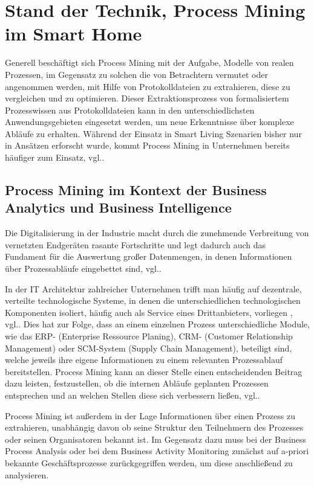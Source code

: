 \chapter{Stand der Technik, Process Mining im Smart Home}\label{chap:stateoftheart}
Generell beschäftigt sich Process Mining mit der Aufgabe, Modelle von realen Prozessen, im Gegensatz zu solchen die von Betrachtern vermutet oder angenommen werden, mit Hilfe von Protokolldateien zu extrahieren, diese zu vergleichen und zu optimieren.\cite{PMinAction}
Dieser Extraktionsprozess von formalisiertem Prozesswissen aus Protokolldateien kann in den  unterschiedlichsten Anwendungsgebieten eingesetzt werden, um neue Erkenntnisse über komplexe Abläufe zu erhalten. Während der Einsatz in Smart Living Szenarien bisher nur in Ansätzen erforscht wurde, kommt Process Mining in Unternehmen bereits häufiger zum Einsatz, vgl.\cite{litreview}.

\section{Process Mining im Kontext der Business Analytics und Business Intelligence}

Die Digitalisierung in der Industrie macht durch die zunehmende Verbreitung von vernetzten Endgeräten rasante Fortschritte und legt dadurch auch das Fundament für die Auswertung großer Datenmengen, in denen Informationen über Prozessabläufe eingebettet sind, vgl.\cite{GanscharGerlac}. 

In der IT Architektur zahlreicher Unternehmen trifft man häufig auf dezentrale, verteilte technologische Systeme, in denen die unterschiedlichen technologischen Komponenten isoliert, häufig auch als Service eines Drittanbieters, vorliegen , vgl.\cite{GanscharGerlac}. Dies hat zur Folge, dass an einem einzelnen Prozess unterschiedliche Module, wie das ERP- (Enterprise Ressource Planing), CRM- (Customer Relationship Management) oder SCM-System (Supply Chain Management), beteiligt sind, welche jeweils ihre eigene Informationen zu einem relevanten Prozessablauf bereitstellen. Process Mining kann an dieser Stelle einen entscheidenden Beitrag dazu leisten, festzustellen, ob die internen Abläufe geplanten Prozessen entsprechen und an welchen Stellen diese sich verbessern ließen, vgl.\cite{PMinAction}.

Process Mining ist außerdem in der Lage Informationen über einen Prozess zu extrahieren, unabhängig davon ob seine Struktur den Teilnehmern des Prozesses oder seinen Organisatoren bekannt ist. Im Gegensatz dazu muss bei der Business Process Analysis oder bei dem Business Activity Monitoring zunächst auf a-priori bekannte Geschäftsprozesse zurückgegriffen werden, um diese anschließend zu analysieren. 

